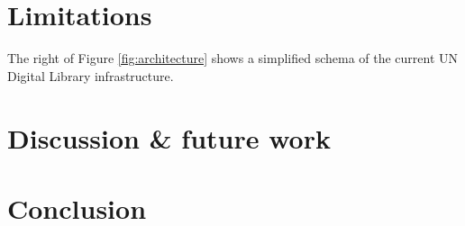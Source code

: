 \documentclass[11pt]{article}
\begin{document}
\section{Limitations} \label{sec:limitations}


The right of Figure \ref{fig:architecture} shows a simplified schema of the current UN Digital Library infrastructure.


\section{Discussion \& future work} \label{sec:discussion-future-work}

\section*{Conclusion} \label{sec:conclusion}
\end{document}

